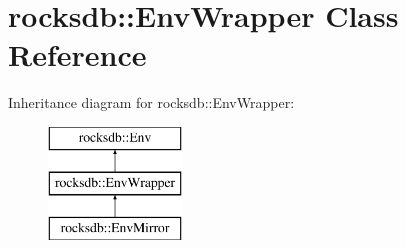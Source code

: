 \hypertarget{classrocksdb_1_1EnvWrapper}{}\section{rocksdb\+:\+:Env\+Wrapper Class Reference}
\label{classrocksdb_1_1EnvWrapper}
Inheritance diagram for rocksdb\+:\+:Env\+Wrapper\+:\begin{figure}[H]
\begin{center}
\leavevmode
\includegraphics[height=3.000000cm]{classrocksdb_1_1EnvWrapper}
\end{center}
\end{figure}

